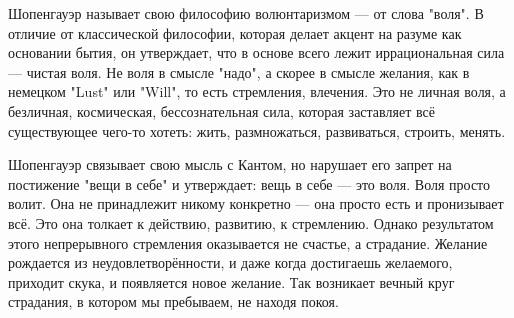 
Шопенгауэр называет свою философию волюнтаризмом --- от слова "воля". В отличие от классической философии, которая делает акцент на разуме как основании бытия, он утверждает, что в основе всего лежит иррациональная сила --- чистая воля. Не воля в смысле "надо", а скорее в смысле желания, как в немецком "Lust" или "Will", то есть стремления, влечения. Это не личная воля, а безличная, космическая, бессознательная сила, которая заставляет всё существующее чего-то хотеть: жить, размножаться, развиваться, строить, менять.

Шопенгауэр связывает свою мысль с Кантом, но нарушает его запрет на постижение "вещи в себе" и утверждает: вещь в себе --- это воля. Воля просто волит. Она не принадлежит никому конкретно --- она просто есть и пронизывает всё. Это она толкает к действию, развитию, к стремлению. Однако результатом этого непрерывного стремления оказывается не счастье, а страдание. Желание рождается из неудовлетворённости, и даже когда достигаешь желаемого, приходит скука, и появляется новое желание. Так возникает вечный круг страдания, в котором мы пребываем, не находя покоя.

